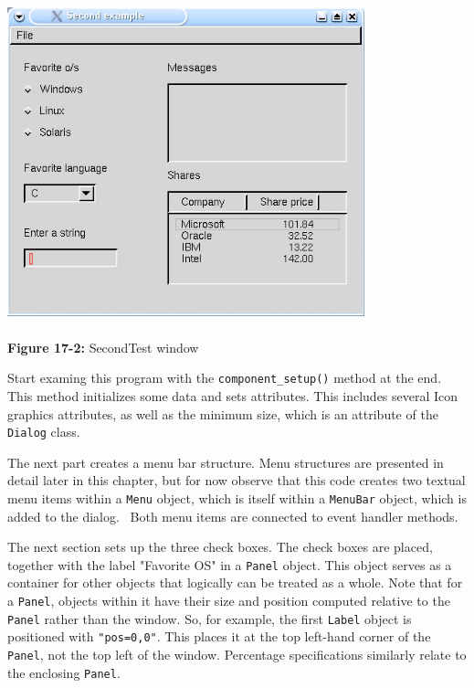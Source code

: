 \begin{center}
\includegraphics[width=4.0756in,height=3.6465in]{ub-img/ub-img51.jpg}
\end{center}

{\sffamily\bfseries Figure 17-2:}
{\sffamily SecondTest window}

\bigskip

Start examing this program with the \texttt{component\_setup()}
method at the end. This method initializes some data and
sets attributes. This includes several Icon graphics attributes,
as well as the minimum size, which is an attribute of the
\texttt{Dialog} class.

The next part creates a menu bar structure.
Menu structures are presented in detail later in this chapter, but for
now observe that this code creates two textual menu items within a
\texttt{Menu} object, which is itself within a \texttt{MenuBar} object,
which is added to the dialog. \ Both menu items are connected to event
handler methods.

The next section sets up the three check boxes. The
check boxes are placed, together with the label "Favorite
OS" in a \texttt{Panel} object. This object
serves as a container for other objects that logically can be treated
as a whole. Note that for a \texttt{Panel},
objects within it have their size and position computed relative
to the \texttt{Panel} rather than the window. So, for example, the
first \texttt{Label} object is positioned with
\texttt{"pos=0,0"}. This places it at the
top left-hand corner of the \texttt{Panel}, not the top left of the
window. Percentage specifications similarly relate to the enclosing
\texttt{Panel}.

